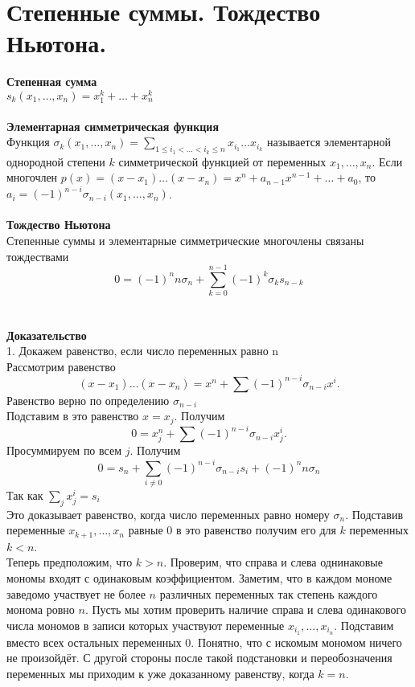 \section{
 Степенные суммы. Тождество Ньютона.
}

{\bf Степенная сумма}\\
$s_k(x_1, \dots, x_n)=x_1^k+\dots+x_n^k$\\
\\
{\bf Элементарная симметрическая функция}\\
Функция $\sigma_k(x_1,\dots, x_n)= \sum_{1\leq i_1<\dots<i_k\leq n}x_{i_1}\dots x_{i_k}$ называется элементарной однородной степени $k$ симметрической функцией от переменных $x_1,\dots, x_n$. Если многочлен $p(x)=(x-x_1)\dots(x-x_n)=x^n+a_{n-1}x^{n-1}+\dots+a_0$, то $a_i=(-1)^{n-i}\sigma_{n-i}(x_1,\dots, x_n)$.\\
\\
{\bf Тождество Ньютона}\\
Степенные суммы и элементарные симметрические многочлены связаны тождествами
$$0=(-1)^n n\sigma_n + \sum_{k=0}^{n-1}(-1)^k \sigma_k s_{n-k}$$\\
\\
{\bf Доказательство}\\
1. Докажем равенство, если число переменных равно n\\
Рассмотрим равенство $$(x-x_1)\dots(x-x_n)=x^n+\sum (-1)^{n-i}\sigma_{n-i} x^i.$$
Равенство верно по определению $\sigma_{n - i}$\\
Подставим в это равенство $x=x_j$. Получим $$0=x_j^n+\sum (-1)^{n-i}\sigma_{n-i} x_j^i.$$
Просуммируем по всем $j$. Получим 
$$0=s_n+\sum_{i\neq 0} (-1)^{n-i}\sigma_{n-i} s_i + (-1)^nn\sigma_n$$
Так как $\sum_j x_j^i = s_i$\\
Это доказывает равенство, когда число переменных равно номеру $\sigma_n$. Подставив переменные $x_{k+1},\dots, x_n$ равные 0 в это равенство получим его для $k$ переменных $k<n$. \\
Теперь  предположим, что $k>n$. Проверим, что справа и слева однинаковые мономы входят с одинаковым коэффициентом.
Заметим, что в каждом мономе заведомо участвует не более $n$ различных переменных так степень каждого монома ровно $n$. Пусть мы хотим проверить наличие справа и слева одинакового числа мономов в записи которых участвуют  переменные $x_{i_1},\dots, x_{i_n}$. Подставим вместо всех остальных переменных 0. Понятно, что с искомым мономом ничего не произойдёт. С другой стороны после такой подстановки и переобозначения переменных мы приходим к уже доказанному равенству, когда $k=n$.

